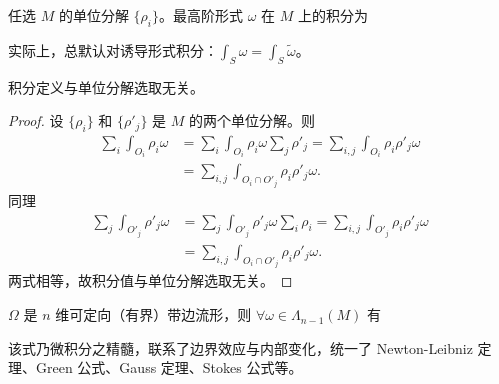 \begin{definition}
    任选 $M$ 的单位分解 $\{\rho_i\}$。最高阶形式 $\omega$ 在 $M$ 上的积分为
\end{definition}
\begin{remark}
    实际上，总默认对诱导形式积分：$\int_S\omega=\int_S\tilde\omega$。
\end{remark}
\begin{theorem}
    积分定义与单位分解选取无关。
\end{theorem}
\begin{proof}
    设 $\{\rho_i\}$ 和 $\{\rho'_j\}$ 是 $M$ 的两个单位分解。则
    \begin{align*}
        \sum_i\int_{O_i}\rho_i\omega &= \sum_i\int_{O_i}\rho_i\omega\sum_j\rho'_j = \sum_{i,j}\int_{O_i}\rho_i\rho'_j\omega\\
        &= \sum_{i,j}\int_{O_i\cap O'_j}\rho_i\rho'_j\omega.
    \end{align*}
    同理
    \begin{align*}
        \sum_j\int_{O'_j}\rho'_j\omega &= \sum_j\int_{O'_j}\rho'_j\omega\sum_i\rho_i = \sum_{i,j}\int_{O'_j}\rho_i\rho'_j\omega\\
        &= \sum_{i,j}\int_{O_i\cap O'_j}\rho_i\rho'_j\omega.
    \end{align*}
    两式相等，故积分值与单位分解选取无关。
\end{proof}



\begin{theorem}[广义Stokes 定理]
    $\Omega$ 是 $n$ 维可定向（有界）带边流形，则 $\forall\omega\in\Lambda_{n-1}(M)$ 有
\end{theorem}
\begin{remark}
    该式乃微积分之精髓，联系了边界效应与内部变化，统一了 Newton-Leibniz 定理、Green 公式、Gauss 定理、Stokes 公式等。
\end{remark}

